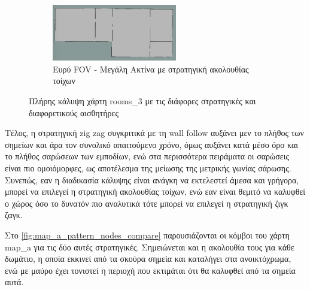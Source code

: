 \begin{figure}[H]\ContinuedFloat
    \captionsetup{justification=centering}
     \begin{subfigure}[b]{\textwidth}
         \centering
         \includegraphics[width=0.6\textwidth]{./images/chapter6/rooms_3_wall_follow_coverage_wide_long.png}
         \caption{Ευρύ FOV - Μεγάλη Ακτίνα με στρατηγική ακολουθίας τοίχων}
         \label{fig:rooms_3_wall_follow_coverage_wide_long}
     \end{subfigure}
     \caption{Πλήρης κάλυψη χάρτη rooms\_3 με τις διάφορες στρατηγικές και διαφορετικούς αισθητήρες}
    \label{fig:rooms_3_sampling_coverage_results_compare}
\end{figure}

Τέλος, η στρατηγική zig zag συγκριτικά με τη wall follow αυξάνει μεν το πλήθος των σημείων και άρα τον συνολικό απαιτούμενο χρόνο, όμως αυξάνει κατά μέσο όρο και το πλήθος σαρώσεων των εμποδίων, ενώ στα περισσότερα πειράματα οι σαρώσεις είναι πιο ομοιόμορφες, ως αποτέλεσμα της μείωσης της μετρικής γωνίας σάρωσης. Συνεπώς, εαν η διαδικασία κάλυψης είναι ανάγκη να εκτελεστεί άμεσα και γρήγορα, μπορεί να επιλεγεί η στρατηγική ακολουθίας τοίχων, ενώ εαν είναι θεμιτό να καλυφθεί ο χώρος όσο το δυνατόν πιο αναλυτικά τότε μπορεί να επιλεγεί η στρατηγική ζιγκ ζαγκ.

Στο \autoref{fig:map_a_pattern_nodes_compare} παρουσιάζονται οι κόμβοι του χάρτη map\_a για τις δύο αυτές στρατηγικές. Σημειώνεται και η ακολουθία τους για κάθε δωμάτιο, η οποία εκκινεί από τα σκούρα σημεία και καταλήγει στα ανοικτόχρωμα, ενώ με μαύρο έχει τονιστεί η περιοχή που εκτιμάται ότι θα καλυφθεί από τα σημεία αυτά. 


